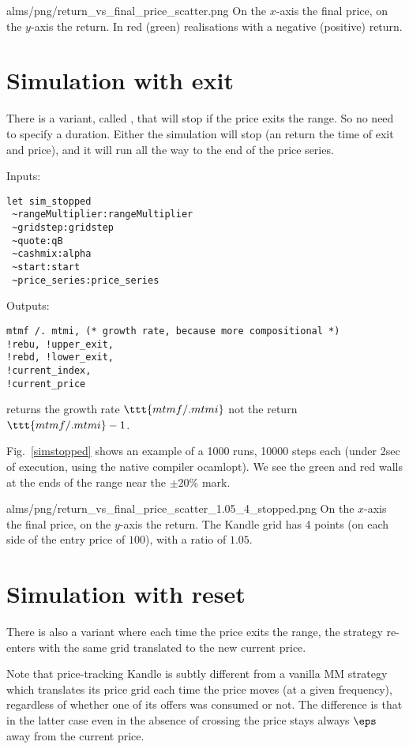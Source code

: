 \documentclass[oneside,12pt]{article}
\begin{document}
\IG{300pt}
{alms/png/return_vs_final_price_scatter.png}
{\label{sim} On the $x$-axis the final price, on the $y$-axis the return. In red (green) realisations with a negative (positive) return.}

\section{Simulation with exit}
There is a variant, called , that will stop if the price exits the range. So no need to specify a duration.
Either the simulation will stop (an return the time of exit and price), and it will run all the way to the
end of the price series.

Inputs:
\begin{verbatim}
let sim_stopped 
 ~rangeMultiplier:rangeMultiplier 
 ~gridstep:gridstep 
 ~quote:qB 
 ~cashmix:alpha
 ~start:start 
 ~price_series:price_series 
\end{verbatim}
 
Outputs:
\begin{verbatim}
mtmf /. mtmi, (* growth rate, because more compositional *)
!rebu, !upper_exit,
!rebd, !lower_exit, 
!current_index,
!current_price
\end{verbatim}


\NB[1]  returns the growth rate $\ttt{mtmf /. mtmi}$ not the return $\ttt{mtmf /. mtmi} - 1$.

Fig.~\ref{simstopped} shows an example of a 1000 runs, 10000 steps each (under 2sec of execution, using the native compiler ocamlopt). 
We see the green and red walls at the ends of the range near the $\pm20\%$ mark.

\IG{250pt}
{alms/png/return_vs_final_price_scatter_1.05_4_stopped.png}
{\label{simstopped} On the $x$-axis the final price, on the $y$-axis the return. The Kandle grid has 4 points (on each side of the entry price of $100$), with a ratio of $1.05$.}


\section{Simulation with reset}
There is also a  variant where each time the price exits the range,
the strategy re-enters with the same grid translated to the new current price.

Note that price-tracking Kandle is subtly different from a vanilla MM strategy which translates its price grid each time the price moves (at a given frequency),
regardless of whether one of its offers was consumed or not. 
The difference is that in the latter case even in the absence of crossing the price stays always $\eps$ away from the current price.
\end{document}
